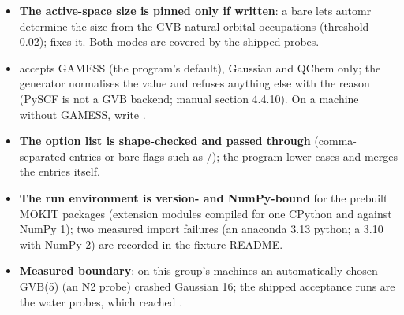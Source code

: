 \begin{readbox}
\begin{itemize}
  \item \textbf{The active-space size is pinned only if written}: a bare
     lets automr determine the size from the GVB
    natural-orbital occupations (threshold 0.02); 
    fixes it.  Both modes are covered by the shipped probes.
  \item \textbf{} accepts GAMESS (the program's default),
    Gaussian and QChem only; the generator normalises the value and
    refuses anything else with the reason (PySCF is not a GVB backend;
    manual section 4.4.10).  On a machine without GAMESS, write
    .
  \item \textbf{The option list is shape-checked and passed through}
    (comma-separated  entries or bare flags such as
    /); the program lower-cases and merges the
    entries itself.
  \item \textbf{The run environment is version- and NumPy-bound} for the
    prebuilt MOKIT packages (extension modules compiled for one CPython
    and against NumPy 1); two measured import failures (an anaconda 3.13
    python; a 3.10 with NumPy 2) are recorded in the fixture README.
  \item \textbf{Measured boundary}: on this group's machines an
    automatically chosen GVB(5) (an N2 probe) crashed Gaussian 16; the
    shipped acceptance runs are the water probes, which reached
    .
\end{itemize}
\end{readbox}
